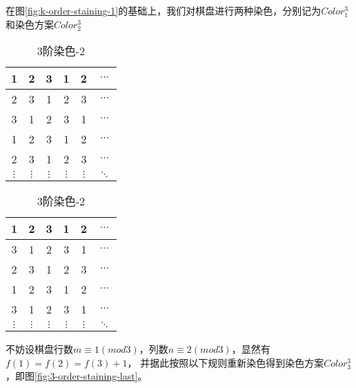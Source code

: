 在图\ref*{fig:k-order-staining-1}的基础上，我们对棋盘进行两种染色，分别记为$Color^3_1$和染色方案$Color^3_2$

\begin{table}[htbp]
	\caption{3阶染色}
	\label{fig:3-order-staining}
	\begin{subtable}{.5\linewidth}
		\centering
		\caption{3阶染色-1}
		\begin{tabular}{|c|c|c|c|c|c|}
			\hline
			1        & 2        & 3        & 1        & 2        & $\cdots$ \\
			\hline
			2        & 3        & 1        & 2        & 3        & $\cdots$ \\
			\hline
			3        & 1        & 2        & 3        & 1        & $\cdots$ \\
			\hline
			1        & 2        & 3        & 1        & 2        & $\cdots$ \\
			\hline
			2        & 3        & 1        & 2        & 3        & $\cdots$ \\
			\hline
			$\vdots$ & $\vdots$ & $\vdots$ & $\vdots$ & $\vdots$ & $\ddots$ \\
			\hline
		\end{tabular}
		\label{fig:3-order-staining-1}
	\end{subtable}%
	\begin{subtable}{.5\linewidth}
		\centering
		\caption{3阶染色-2}
		\begin{tabular}{|c|c|c|c|c|c|}
			\hline
			1        & 2        & 3        & 1        & 2        & $\cdots$ \\
			\hline
			3        & 1        & 2        & 3        & 1        & $\cdots$ \\
			\hline
			2        & 3        & 1        & 2        & 3        & $\cdots$ \\
			\hline
			1        & 2        & 3        & 1        & 2        & $\cdots$ \\
			\hline
			3        & 1        & 2        & 3        & 1        & $\cdots$ \\
			\hline
			$\vdots$ & $\vdots$ & $\vdots$ & $\vdots$ & $\vdots$ & $\ddots$ \\
			\hline
		\end{tabular}
		\label{fig:3-order-staining-2}
	\end{subtable}
\end{table}

不妨设棋盘行数$m \equiv 1 (mod 3)$，列数$n \equiv 2 (mod 3)$，显然有$f(1) = f(2) = f(3) + 1$，
并据此按照以下规则重新染色得到染色方案$Color^3_3$，即图\ref*{fig:3-order-staining-last}。


